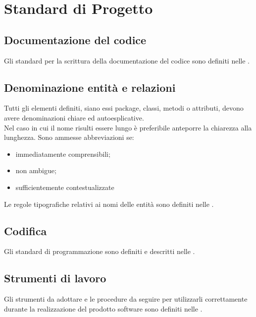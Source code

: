 \newpage
\section{Standard di Progetto}
\subsection{Documentazione del codice}
Gli standard per la scrittura della documentazione del codice sono definiti nelle \normeDiProgetto.

\subsection{Denominazione entità e relazioni}
Tutti gli elementi definiti, siano essi package, classi, metodi o attributi, devono avere denominazioni chiare ed autoesplicative. \\
Nel caso in cui il nome risulti essere lungo è preferibile anteporre la chiarezza alla lunghezza.
Sono ammesse abbreviazioni se:
\begin{itemize}
	\item immediatamente comprensibili;
	\item non ambigue;
	\item sufficientemente contestualizzate
\end{itemize}
Le regole tipografiche relativi ai nomi delle entità sono definiti nelle \normeDiProgetto.

\subsection{Codifica}
Gli standard di programmazione sono definiti e descritti nelle  \normeDiProgetto.

\subsection{Strumenti di lavoro}
Gli strumenti da adottare e le procedure da seguire per utilizzarli correttamente durante la realizzazione del prodotto software sono definiti nelle  \normeDiProgetto.
\newpage